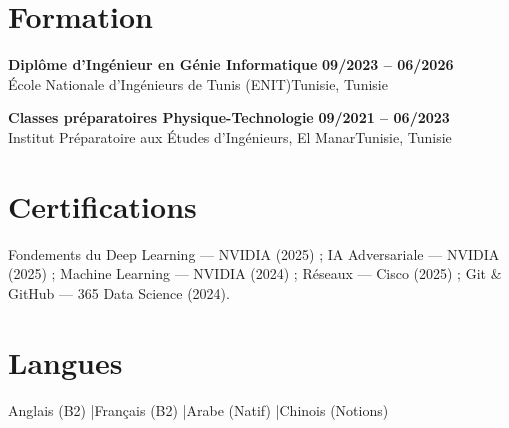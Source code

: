 \documentclass[a4paper,10pt]{article}
\newcommand{\cventry}[4]{\textbf{#1} \hfill \textbf{#4}\\[1pt]#2{\ifx\relax#3\relax\else, #3\fi}\par\vspace{2pt}}
\begin{document}
\section{Formation}
\cventry{Diplôme d'Ingénieur en Génie Informatique}{École Nationale d'Ingénieurs de Tunis (ENIT)}{Tunisie}{09/2023 -- 06/2026}
\cventry{Classes préparatoires Physique-Technologie}{Institut Préparatoire aux Études d'Ingénieurs, El Manar}{Tunisie}{09/2021 -- 06/2023}
\section{Certifications}
Fondements du Deep Learning — NVIDIA (2025) ; IA Adversariale — NVIDIA (2025) ; Machine Learning — NVIDIA (2024) ; Réseaux — Cisco (2025) ; Git \& GitHub — 365 Data Science (2024).
\section{Langues}
Anglais (B2) \quad|\quad Français (B2) \quad|\quad Arabe (Natif) \quad|\quad Chinois (Notions)
\end{document}
